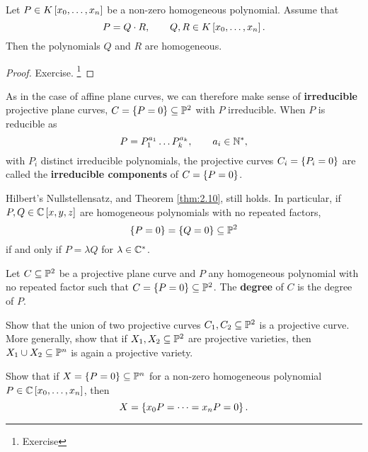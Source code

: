 \begin{lemma}
\label{lem:4.10}
Let $ P \in K\sbr{x_0, \dots, x_n} $ be a non-zero homogeneous polynomial. Assume that
$$ P = Q \cdot R, \qquad Q, R \in K\sbr{x_0, \dots, x_n}. $$
Then the polynomials $ Q $ and $ R $ are homogeneous.
\end{lemma}

\begin{proof}
Exercise. \footnote{Exercise}
\end{proof}

\begin{remark}
As in the case of affine plane curves, we can therefore make sense of \textbf{irreducible} projective plane curves, $ C = \cbr{P = 0} \subseteq \PP^2 $ with $ P $ irreducible. When $ P $ is reducible as
$$ P = P_1^{a_1} \dots P_k^{a_k}, \qquad a_i \in \mathbb{N}^*, $$
with $ P_i $ distinct irreducible polynomials, the projective curves $ C_i = \cbr{P_i = 0} $ are called the \textbf{irreducible components} of $ C = \cbr{P = 0} $.
\end{remark}

\begin{remark}
\label{rem:4.12}
Hilbert's Nullstellensatz, and Theorem \ref{thm:2.10}, still holds. In particular, if $ P, Q \in \CC\sbr{x, y, z} $ are homogeneous polynomials with no repeated factors,
$$ \cbr{P = 0} = \cbr{Q = 0} \subseteq \PP^2 $$
if and only if $ P = \lambda Q $ for $ \lambda \in \mathbb{C}^* $.
\end{remark}

\begin{definition}
Let $ C \subseteq \mathbb{P}^2 $ be a projective plane curve and $ P $ any homogeneous polynomial with no repeated factor such that $ C = \cbr{P = 0} \subseteq \PP^2 $. The \textbf{degree} of $ C $ is the degree of $ P $.
\end{definition}

\begin{exercise**}
Show that the union of two projective curves $ C_1, C_2 \subseteq \mathbb{P}^2 $ is a projective curve. More generally, show that if $ X_1, X_2 \subseteq \mathbb{P}^2 $ are projective varieties, then $ X_1 \cup X_2 \subseteq \mathbb{P}^n $ is again a projective variety.
\end{exercise**}

\begin{exercise**}
Show that if $ X = \cbr{P = 0} \subseteq \PP^n $ for a non-zero homogeneous polynomial $ P \in \CC\sbr{x_0, \dots, x_n} $, then
$$ X = \cbr{x_0P = \dots = x_nP = 0}. $$
\end{exercise**}

